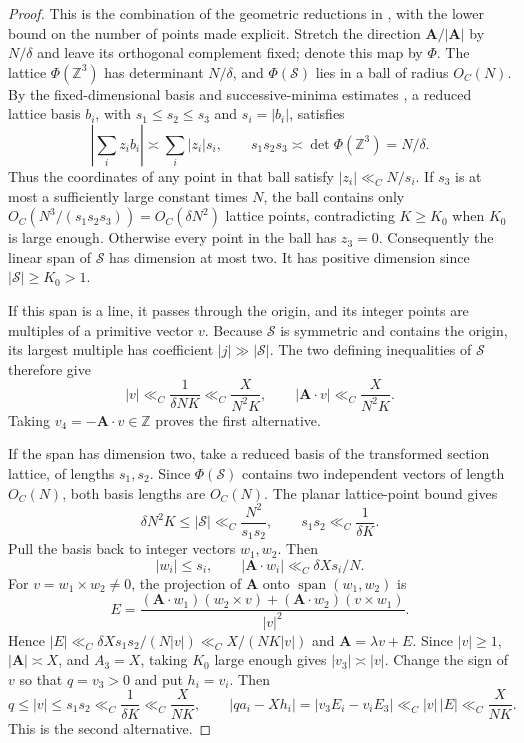 \documentclass[11pt,a4paper]{article}
\theoremstyle{paperplain}
\numberwithin{equation}{section}
\begin{document}
\begin{proof}
This is the combination of the geometric reductions in
\cite[Lemmas 13.2 and 14.1]{Maynard2019}, with the lower bound on the
number of points made explicit.
Stretch the direction $\mathbf A/|\mathbf A|$ by $N/\delta$ and leave its
orthogonal complement fixed; denote this map by $\Phi$.
The lattice $\Phi(\mathbb Z^3)$ has determinant $N/\delta$, and
$\Phi(\mathcal S)$ lies in a ball of radius $O_C(N)$.
By the fixed-dimensional basis and successive-minima estimates
\cite[Section~5]{Maynard2019}, a reduced lattice basis $b_i$, with
$s_1\le s_2\le s_3$ and $s_i=|b_i|$, satisfies
\[
 \left|\sum_i z_i b_i\right|\asymp\sum_i|z_i|s_i,\qquad
 s_1s_2s_3\asymp\det\Phi(\mathbb Z^3)=N/\delta.
\]
Thus the coordinates of any point in that ball satisfy
$|z_i|\ll_C N/s_i$.
If $s_3$ is at most a sufficiently large constant times $N$, the ball
contains only
$O_C(N^3/(s_1s_2s_3))=O_C(\delta N^2)$ lattice points, contradicting
$K\ge K_0$ when $K_0$ is large enough.
Otherwise every point in the ball has $z_3=0$.
Consequently the linear span of $\mathcal S$ has dimension at most two.
It has positive dimension since $|\mathcal S|\ge K_0>1$.

If this span is a line, it passes through the origin, and its integer
points are multiples of a primitive vector $v$.
Because $\mathcal S$ is symmetric and contains the origin, its largest
multiple has coefficient $|j|\gg|\mathcal S|$.
The two defining inequalities of $\mathcal S$ therefore give
\[
 |v|\ll_C\frac1{\delta NK}\ll_C\frac X{N^2K},
 \qquad
 |\mathbf A\cdot v|\ll_C\frac X{N^2K}.
\]
Taking $v_4=-\mathbf A\cdot v\in\mathbb Z$ proves the first alternative.

If the span has dimension two, take a reduced basis of the transformed
section lattice, of lengths $s_1,s_2$.
Since $\Phi(\mathcal S)$ contains two independent vectors of length
$O_C(N)$, both basis lengths are $O_C(N)$.
The planar lattice-point bound gives
\[
 \delta N^2K\le|\mathcal S|\ll_C\frac{N^2}{s_1s_2},
 \qquad s_1s_2\ll_C\frac1{\delta K}.
\]
Pull the basis back to integer vectors $w_1,w_2$. Then
\[
 |w_i|\le s_i,\qquad
 |\mathbf A\cdot w_i|\ll_C\delta Xs_i/N.
\]
For $v=w_1\times w_2\ne0$, the projection of $\mathbf A$ onto
$\operatorname{span}(w_1,w_2)$ is
\[
 E=\frac{(\mathbf A\cdot w_1)(w_2\times v)
       +(\mathbf A\cdot w_2)(v\times w_1)}{|v|^2}.
\]
Hence
$|E|\ll_C\delta Xs_1s_2/(N|v|)\ll_C X/(NK|v|)$ and
$\mathbf A=\lambda v+E$.
Since $|v|\ge1$, $|\mathbf A|\asymp X$, and $A_3=X$, taking $K_0$
large enough gives $|v_3|\asymp|v|$.
Change the sign of $v$ so that $q=v_3>0$ and put $h_i=v_i$.
Then
\[
 q\le|v|\le s_1s_2\ll_C\frac1{\delta K}\ll_C\frac X{NK},
 \qquad
 |qa_i-Xh_i|=|v_3E_i-v_iE_3|
 \ll_C|v|\,|E|\ll_C\frac X{NK}.
\]
This is the second alternative.
\end{proof}
\end{document}

